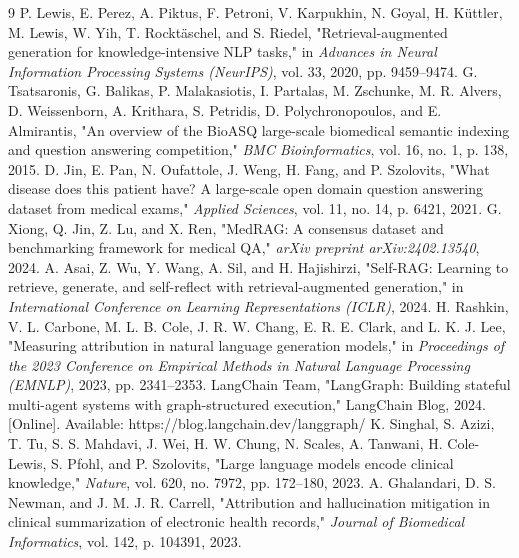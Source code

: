 \documentclass[sn-mathphys,Numbered]{sn-jnl}%
\begin{document}
\begin{backmatter}
\begin{thebibliography}{9}
 P. Lewis, E. Perez, A. Piktus, F. Petroni, V. Karpukhin, N. Goyal, H. Küttler, M. Lewis, W. Yih, T. Rocktäschel, and S. Riedel, "Retrieval-augmented generation for knowledge-intensive NLP tasks," in \emph{Advances in Neural Information Processing Systems (NeurIPS)}, vol. 33, 2020, pp. 9459–9474.
 G. Tsatsaronis, G. Balikas, P. Malakasiotis, I. Partalas, M. Zschunke, M. R. Alvers, D. Weissenborn, A. Krithara, S. Petridis, D. Polychronopoulos, and E. Almirantis, "An overview of the BioASQ large-scale biomedical semantic indexing and question answering competition," \emph{BMC Bioinformatics}, vol. 16, no. 1, p. 138, 2015.
 D. Jin, E. Pan, N. Oufattole, J. Weng, H. Fang, and P. Szolovits, "What disease does this patient have? A large-scale open domain question answering dataset from medical exams," \emph{Applied Sciences}, vol. 11, no. 14, p. 6421, 2021.
 G. Xiong, Q. Jin, Z. Lu, and X. Ren, "MedRAG: A consensus dataset and benchmarking framework for medical QA," \emph{arXiv preprint arXiv:2402.13540}, 2024.
 A. Asai, Z. Wu, Y. Wang, A. Sil, and H. Hajishirzi, "Self-RAG: Learning to retrieve, generate, and self-reflect with retrieval-augmented generation," in \emph{International Conference on Learning Representations (ICLR)}, 2024.
 H. Rashkin, V. L. Carbone, M. L. B. Cole, J. R. W. Chang, E. R. E. Clark, and L. K. J. Lee, "Measuring attribution in natural language generation models," in \emph{Proceedings of the 2023 Conference on Empirical Methods in Natural Language Processing (EMNLP)}, 2023, pp. 2341–2353.
 LangChain Team, "LangGraph: Building stateful multi-agent systems with graph-structured execution," LangChain Blog, 2024. [Online]. Available: https://blog.langchain.dev/langgraph/
 K. Singhal, S. Azizi, T. Tu, S. S. Mahdavi, J. Wei, H. W. Chung, N. Scales, A. Tanwani, H. Cole-Lewis, S. Pfohl, and P. Szolovits, "Large language models encode clinical knowledge," \emph{Nature}, vol. 620, no. 7972, pp. 172–180, 2023.
 A. Ghalandari, D. S. Newman, and J. M. J. R. Carrell, "Attribution and hallucination mitigation in clinical summarization of electronic health records," \emph{Journal of Biomedical Informatics}, vol. 142, p. 104391, 2023.
\end{thebibliography}

\end{backmatter}
\end{document}
